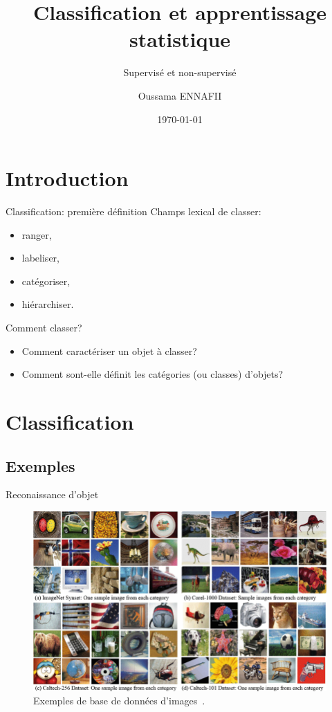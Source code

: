 \documentclass[8pt]{beamer}
\title{Classification et apprentissage statistique}
\subtitle{Supervisé et non-supervisé}
\author{Oussama ENNAFII}
\institute{ENSG}
\date{\today}
\begin{document}
	\begin{frame}[plain]
		\titlepage{}
	\end{frame}

	\section{Introduction}
		\begin{frame}{Classification: première définition}
			Champs lexical de classer:
			\begin{itemize}
				\item<2-> ranger,
				\item<3-> labeliser,
				\item<4-> catégoriser,
				\item<5-> hiérarchiser.
			\end{itemize}
		\end{frame}
		
		\begin{frame}{Comment classer?}
			\begin{itemize}
					\item<1-> Comment caractériser un objet à classer?
					\item<2-> Comment sont-elle définit les catégories (ou classes) d'objets?
			\end{itemize}
		\end{frame}
	
	\section{Classification}
		\subsection{Exemples}
			\begin{frame}{Reconaissance d'objet}
				\begin{figure}[H]
					\includegraphics[width=.7\textwidth]{images/samples/image_datasets}
					\caption*{\tiny Exemples de base de données d'images~\cite{ahmed2017fusion}.}
				\end{figure}
			\end{frame}
			
\end{document}
